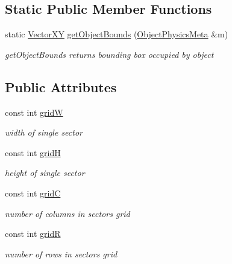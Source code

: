 \subsection*{Static Public Member Functions}
\begin{DoxyCompactItemize}
\item 
static \hyperlink{classVectorXY}{Vector\+X\+Y} \hyperlink{classPhysicsEngine_1_1CollisionGrid_adad4599413ced1499d2b8fb35d60034d}{get\+Object\+Bounds} (\hyperlink{classObjectPhysicsMeta}{Object\+Physics\+Meta} \&m)
\begin{DoxyCompactList}\small\item\em get\+Object\+Bounds returns bounding box occupied by object \end{DoxyCompactList}\end{DoxyCompactItemize}
\subsection*{Public Attributes}
\begin{DoxyCompactItemize}
\item 
\hypertarget{classPhysicsEngine_1_1CollisionGrid_a8453235376bf615693c1aa96f0f64744}{}const int \hyperlink{classPhysicsEngine_1_1CollisionGrid_a8453235376bf615693c1aa96f0f64744}{grid\+W}\label{classPhysicsEngine_1_1CollisionGrid_a8453235376bf615693c1aa96f0f64744}

\begin{DoxyCompactList}\small\item\em width of single sector \end{DoxyCompactList}\item 
\hypertarget{classPhysicsEngine_1_1CollisionGrid_ace91b9c4a8ff771dfb3bf27958a759f6}{}const int \hyperlink{classPhysicsEngine_1_1CollisionGrid_ace91b9c4a8ff771dfb3bf27958a759f6}{grid\+H}\label{classPhysicsEngine_1_1CollisionGrid_ace91b9c4a8ff771dfb3bf27958a759f6}

\begin{DoxyCompactList}\small\item\em height of single sector \end{DoxyCompactList}\item 
\hypertarget{classPhysicsEngine_1_1CollisionGrid_a603a2779e67a16deee6ffb44256ba44c}{}const int \hyperlink{classPhysicsEngine_1_1CollisionGrid_a603a2779e67a16deee6ffb44256ba44c}{grid\+C}\label{classPhysicsEngine_1_1CollisionGrid_a603a2779e67a16deee6ffb44256ba44c}

\begin{DoxyCompactList}\small\item\em number of columns in sectors grid \end{DoxyCompactList}\item 
\hypertarget{classPhysicsEngine_1_1CollisionGrid_ae430a085d671849fe2b0ae4ac15834d5}{}const int \hyperlink{classPhysicsEngine_1_1CollisionGrid_ae430a085d671849fe2b0ae4ac15834d5}{grid\+R}\label{classPhysicsEngine_1_1CollisionGrid_ae430a085d671849fe2b0ae4ac15834d5}

\begin{DoxyCompactList}\small\item\em number of rows in sectors grid \end{DoxyCompactList}\end{DoxyCompactItemize}
